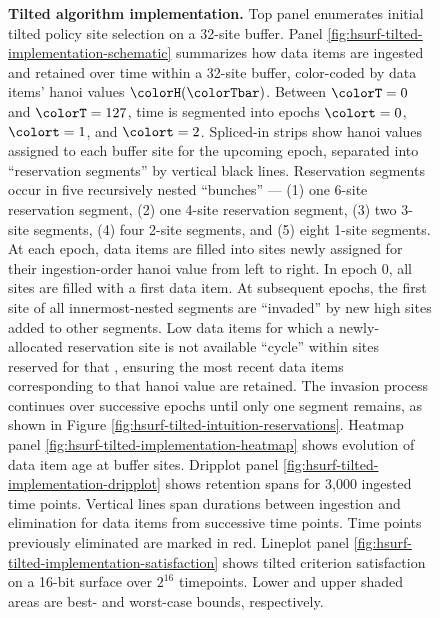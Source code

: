 \begin{figure}[htbp!]
\vspace{-2ex}\caption{%
  \textbf{Tilted algorithm implementation.}
  \footnotesize
  Top panel \label{fig:hsurf-tilted-implementation-site-selection} enumerates initial tilted policy site selection on a 32-site buffer.
  Panel \ref{fig:hsurf-tilted-implementation-schematic} summarizes how data items are ingested and retained over time within a 32-site buffer, color-coded by data items' hanoi values $\colorH(\colorTbar)$.
  Between $\colorT=0$ and $\colorT=127$, time is segmented into epochs $\colort=0$, $\colort=1$, and $\colort=2$.
  Spliced-in strips show hanoi values assigned to each buffer site for the upcoming epoch, separated into ``reservation segments'' by vertical black lines.
  Reservation segments occur in five recursively nested ``bunches'' --- (1) one 6-site reservation segment, (2) one 4-site reservation segment, (3) two 3-site segments, (4) four 2-site segments, and (5) eight 1-site segments.
  At each epoch, data items are filled into sites newly assigned for their ingestion-order hanoi value from left to right.
  In epoch 0, all sites are filled with a first data item.
  At subsequent epochs, the first site of all innermost-nested segments are ``invaded'' by new high \hv{} sites added to other segments.
  Low \hv{} data items for which a newly-allocated reservation site is not available ``cycle'' within sites reserved for that \hv{}, ensuring the most recent data items corresponding to that hanoi value are retained.
  The invasion process continues over successive epochs until only one segment remains, as shown in Figure \ref{fig:hsurf-tilted-intuition-reservations}.
  Heatmap panel \ref{fig:hsurf-tilted-implementation-heatmap} shows evolution of data item age at buffer sites.
  Dripplot panel \ref{fig:hsurf-tilted-implementation-dripplot} shows retention spans for 3,000 ingested time points.
  Vertical lines span durations between ingestion and elimination for data items from successive time points.
  Time points previously eliminated are marked in red.
  Lineplot panel \ref{fig:hsurf-tilted-implementation-satisfaction} shows tilted criterion satisfaction on a 16-bit surface over $2^{16}$ timepoints.
  Lower and upper shaded areas are best- and worst-case bounds, respectively.
}
\label{fig:hsurf-tilted-implementation}

\end{figure}
